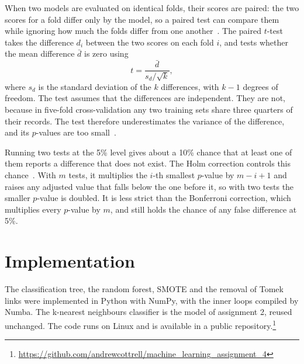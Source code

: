 \documentclass[conference,10pt]{IEEEtran}
\begin{document}
When two models are evaluated on identical folds, their scores are paired:
the two scores for a fold differ only by the model, so a paired test can
compare them while ignoring how much the folds differ from one
another~\cite{dietterich1998approximate}. The paired $t$-test takes the
difference $d_i$ between the two scores on each fold $i$, and tests whether
the mean difference $\bar{d}$ is zero using
\begin{equation}
  t = \frac{\bar{d}}{s_d / \sqrt{k}},
\end{equation}
where $s_d$ is the standard deviation of the $k$ differences, with $k-1$
degrees of freedom. The test assumes that the differences are independent.
They are not, because in five-fold cross-validation any two training sets
share three quarters of their records. The test therefore underestimates
the variance of the difference, and its $p$-values are too
small~\cite{dietterich1998approximate,nadeau2003inference}.

Running two tests at the 5\% level gives about a 10\% chance that at least
one of them reports a difference that does not exist. The Holm correction
controls this chance~\cite{holm1979simple}. With $m$ tests, it multiplies the $i$-th smallest $p$-value by $m-i+1$ and raises any adjusted value that falls below the one before it, so with
two tests the smaller $p$-value
is doubled. It is less strict than the Bonferroni correction, which
multiplies every $p$-value by $m$, and still holds the chance of any false
difference at 5\%.

\section{Implementation}
\label{sec:implementation}

The classification tree, the random forest, SMOTE and the removal of Tomek
links were implemented in Python with NumPy, with the inner loops compiled
by Numba. The k-nearest neighbours classifier is the model of assignment 2,
reused unchanged. 
The code runs on Linux and is available in a public
repository.\footnote{\url{https://github.com/andrewcottrell/machine_learning_assignment_4}}
\end{document}
